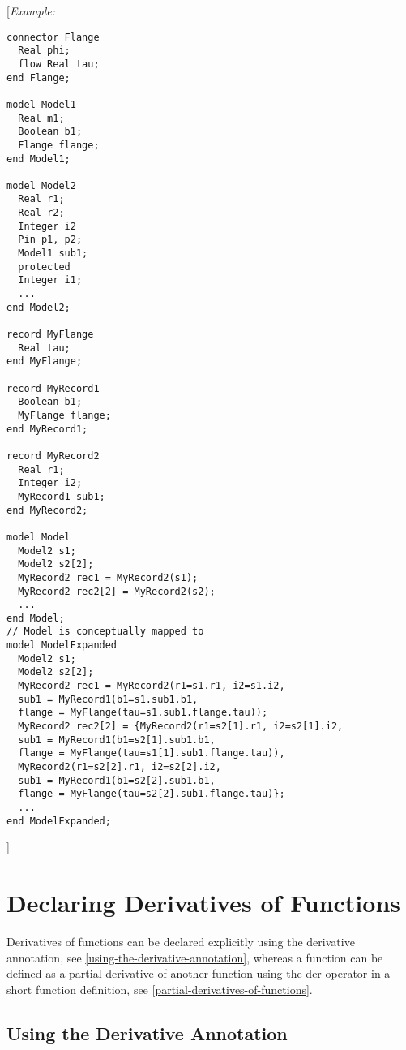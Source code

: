 {[}\emph{Example:}

\begin{lstlisting}[language=modelica]
connector Flange
  Real phi;
  flow Real tau;
end Flange;

model Model1
  Real m1;
  Boolean b1;
  Flange flange;
end Model1;

model Model2
  Real r1;
  Real r2;
  Integer i2
  Pin p1, p2;
  Model1 sub1;
  protected
  Integer i1;
  ...
end Model2;

record MyFlange
  Real tau;
end MyFlange;

record MyRecord1
  Boolean b1;
  MyFlange flange;
end MyRecord1;

record MyRecord2
  Real r1;
  Integer i2;
  MyRecord1 sub1;
end MyRecord2;

model Model
  Model2 s1;
  Model2 s2[2];
  MyRecord2 rec1 = MyRecord2(s1);
  MyRecord2 rec2[2] = MyRecord2(s2);
  ...
end Model;
// Model is conceptually mapped to
model ModelExpanded
  Model2 s1;
  Model2 s2[2];
  MyRecord2 rec1 = MyRecord2(r1=s1.r1, i2=s1.i2,
  sub1 = MyRecord1(b1=s1.sub1.b1,
  flange = MyFlange(tau=s1.sub1.flange.tau));
  MyRecord2 rec2[2] = {MyRecord2(r1=s2[1].r1, i2=s2[1].i2,
  sub1 = MyRecord1(b1=s2[1].sub1.b1,
  flange = MyFlange(tau=s1[1].sub1.flange.tau)),
  MyRecord2(r1=s2[2].r1, i2=s2[2].i2,
  sub1 = MyRecord1(b1=s2[2].sub1.b1,
  flange = MyFlange(tau=s2[2].sub1.flange.tau)};
  ...
end ModelExpanded;
\end{lstlisting}
{]}

\section{Declaring Derivatives of Functions}

Derivatives of functions can be declared explicitly using the derivative
annotation, see \autoref{using-the-derivative-annotation}, whereas a function can be defined as a
partial derivative of another function using the der-operator in a short
function definition, see \autoref{partial-derivatives-of-functions}.

\subsection{Using the Derivative Annotation}

